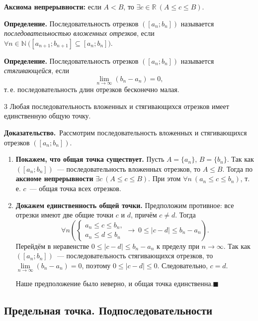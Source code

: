 \documentclass[a4paper,11pt]{article}
\newcommand{\dok}{\textbf{Доказательство.}\ }
\newcommand{\qedr}{\hfill$\blacksquare$}
\begin{document}
\textbf{Аксиома непрерывности:} если $A < B$, то $\exists c \in \mathbb{R}\ (A \le c \le B)$.

\begin{opr}
\textbf{Определение.} Последовательность отрезков $([a_n; b_n])$ называется
\emph{последовательностью вложенных отрезков}, если
$\forall n \in \mathbb{N}\ \big([a_{n+1}; b_{n+1}] \subseteq [a_n; b_n]\big)$.
\end{opr}

\begin{opr}
\textbf{Определение.} Последовательность отрезков $([a_n; b_n])$ называется \emph{стягивающейся}, если
\[
  \lim_{n \to \infty} (b_n - a_n) = 0,
\]
т.\,е. последовательность длин отрезков бесконечно малая.
\end{opr}

\begin{teor}{3}
  Любая последовательность вложенных и стягивающихся отрезков имеет единственную общую точку.
\end{teor}

\dok Рассмотрим последовательность вложенных и стягивающихся отрезков $([a_n; b_n])$.

\begin{enumerate}[label=\arabic*)]
\item \textbf{Покажем, что общая точка существует.}
Пусть $A = \{a_n\}$, $B = \{b_n\}$. Так как $([a_n; b_n])$~--- последовательность вложенных отрезков,
то $A \le B$. Тогда по \textbf{аксиоме непрерывности}
$\exists c\ (A \le c \le B)$. При этом $\forall n\ (a_n \le c \le b_n)$, т.\,е. $c$~--- общая точка всех отрезков.

\item \textbf{Докажем единственность общей точки.}
Предположим противное: все отрезки имеют две общие точки $c$ и $d$, причём $c \ne d$. Тогда
\[
  \forall n \left(\begin{cases}
    a_n \le c \le b_n, \\
    a_n \le d \le b_n
  \end{cases} \rightarrow\ 0 \le |c - d| \le b_n - a_n\right).
\]
Перейдём в неравенстве $0 \le |c - d| \le b_n - a_n$ к пределу при $n \to \infty$.
Так как $([a_n; b_n])$~--- последовательность стягивающихся отрезков, то
$\lim\limits_{n \to \infty} (b_n - a_n) = 0$, поэтому $0 \le |c - d| \le 0$. Следовательно, $c = d$.

Наше предположение было неверно, и общая точка единственна.\qedr
\end{enumerate}

\subsection{Предельная точка. Подпоследовательности}
\end{document}

